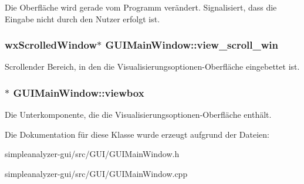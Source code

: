 Die Oberfläche wird gerade vom Programm verändert. Signalisiert, dass die Eingabe nicht durch den Nutzer erfolgt ist. \hypertarget{classGUIMainWindow_ad440f7451fd3fdabbe48518a89e61e45}{
\subsubsection[{view\-\_\-scroll\-\_\-win}]{\setlength{\rightskip}{0pt plus 5cm}wx\-Scrolled\-Window$\ast$ G\-U\-I\-Main\-Window\-::view\-\_\-scroll\-\_\-win\hspace{0.3cm}{\ttfamily [private]}}}\label{classGUIMainWindow_ad440f7451fd3fdabbe48518a89e61e45}
Scrollender Bereich, in den die Visualisierungsoptionen-\/\-Oberfläche eingebettet ist. \hypertarget{classGUIMainWindow_a3e9a4e301f90e85e97721aa71b197ca8}{
\subsubsection[{viewbox}]{$\ast$ G\-U\-I\-Main\-Window\-::viewbox\hspace{0.3cm}{\ttfamily [private]}}}\label{classGUIMainWindow_a3e9a4e301f90e85e97721aa71b197ca8}
Die Unterkomponente, die die Visualisierungsoptionen-\/\-Oberfläche enthält. 

Die Dokumentation für diese Klasse wurde erzeugt aufgrund der Dateien\-:\begin{DoxyCompactItemize}
\item 
simpleanalyzer-\/gui/src/\-G\-U\-I/G\-U\-I\-Main\-Window.\-h\item 
simpleanalyzer-\/gui/src/\-G\-U\-I/G\-U\-I\-Main\-Window.\-cpp\end{DoxyCompactItemize}

